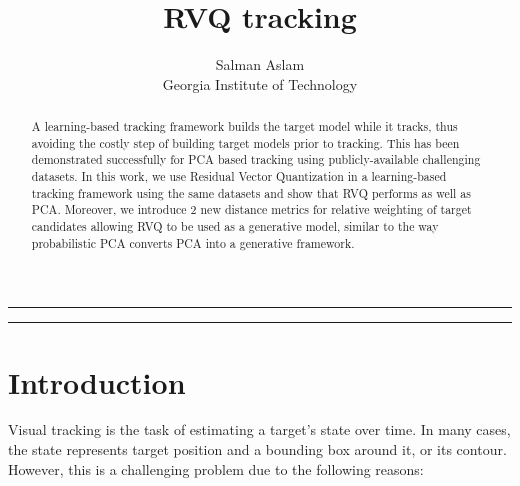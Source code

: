
\title{RVQ tracking}
\author{Salman Aslam\\ Georgia Institute of Technology}
\date{}


\maketitle
\rule[0pt]{\textwidth}{1pt}
\tableofcontents
\rule[0pt]{\textwidth}{1pt}
\newcommand{\dr}{(\mathbf{x}_i-\mathbf{\hat{x}}_i)^T(\mathbf{x}_i-\mathbf{\hat{x}}_i) + \lambda({Q_{\textrm{max}}-Q_i})}

\begin{abstract}
A learning-based tracking framework builds the target model while it tracks, thus avoiding the costly step of building target models prior to tracking.  This has been demonstrated successfully for PCA based tracking using publicly-available challenging datasets.  In this work, we use Residual Vector Quantization in a learning-based tracking framework using the same datasets and show that RVQ performs as well as PCA.  Moreover, we introduce 2 new distance metrics for relative weighting of target candidates allowing RVQ to be used as a generative model, similar to the way probabilistic PCA converts PCA into a generative framework.
\end{abstract}

\section{Introduction}
Visual tracking is the task of estimating a target's state over time.  In many cases, the state represents target position and a bounding box around it, or its contour.  However, this is a challenging problem due to the following reasons:

